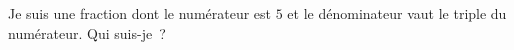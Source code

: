 %
%
Je suis une fraction dont le numérateur est $5$ et le dénominateur vaut le triple du numérateur. Qui suis-je~?
